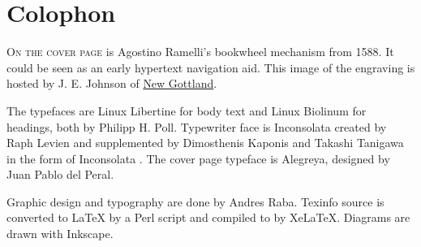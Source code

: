 \chapter*{Colophon}
\label{Colophon}

\lettrine[lraise=-0.03,loversize=0.08]{O}{n the cover page} is Agostino Ramelli's bookwheel mechanism from 1588. It could be seen as an early hypertext navigation aid. This image of the engraving is hosted by J. E. Johnson of \href{http://newgottland.com/2012/02/09/before-the-ereader-there-was-the-wheelreader/ramelli_bookwheel_1032px/}{New Gottland}.

The typefaces are Linux Libertine for body text and Linux Biolinum for headings, both by Philipp H. Poll. Typewriter face is Inconsolata created by Raph Levien and supplemented by Dimosthenis Kaponis and Takashi Tanigawa in the form of Inconsolata . The cover page typeface is Alegreya, designed by Juan Pablo del Peral.

Graphic design and typography are done by Andres Raba. Texinfo source is converted to LaTeX by a Perl script and compiled to  by XeLaTeX. Diagrams are drawn with Inkscape.
